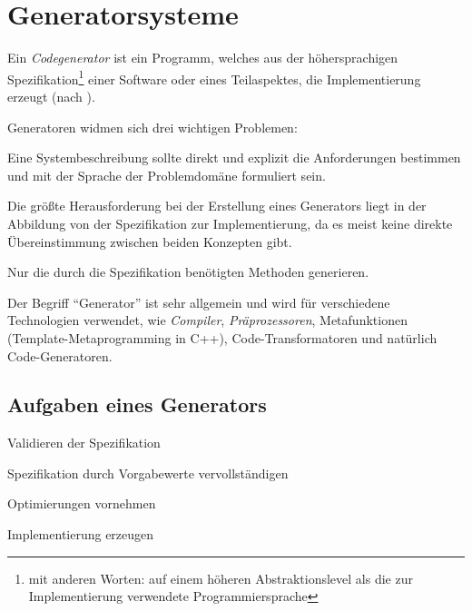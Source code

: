 \section{Generatorsysteme}
\label{sec:generatorsystems}

Ein \emph{Codegenerator} ist ein Programm, welches aus der höhersprachigen Spezifikation\footnote{mit anderen Worten: auf einem höheren Abstraktionslevel als die zur Implementierung verwendete Programmiersprache} einer Software oder eines Teilaspektes, die Implementierung erzeugt (nach \cite{czarnecki2000generative}).

Generatoren widmen sich drei wichtigen Problemen\cite{czarnecki2000generative}:
\begin{description}[style=nextline]
    \item[Relevanz von Systembeschreibungen erhöhen] Eine Systembeschreibung sollte direkt und explizit die Anforderungen bestimmen und mit der Sprache der Problemdomäne formuliert sein.
    \item[Erzeugung einer effizienten Implementierung] Die größte Herausforderung bei der Erstellung eines Generators liegt in der Abbildung von der Spezifikation zur Implementierung, da es meist keine direkte Übereinstimmung zwischen beiden Konzepten gibt.
    \item[\enquote{Library scaling problem}] Nur die durch die Spezifikation benötigten Methoden generieren.
\end{description}

Der Begriff \enquote{Generator} ist sehr allgemein und wird für verschiedene Technologien verwendet, wie \emph{Compiler}, \emph{Präprozessoren}, Metafunktionen (Template-Metaprogramming in C++), Code-Transformatoren und natürlich Code-Generatoren.

\subsection{Aufgaben eines Generators}
\begin{compactenum}
    \item Validieren der Spezifikation
    \item Spezifikation durch Vorgabewerte vervollständigen
    \item Optimierungen vornehmen
    \item Implementierung erzeugen
\end{compactenum}

